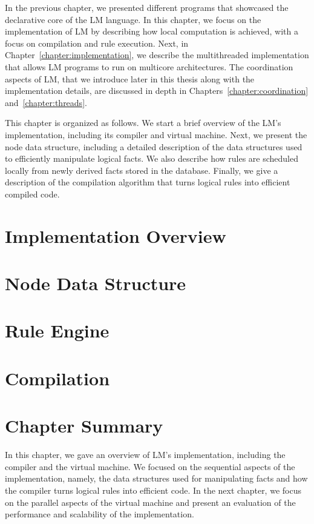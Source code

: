 
In the previous chapter, we presented different programs that showcased the
declarative core of the LM language. In this chapter, we focus on the
implementation of LM by describing how local computation is achieved, with a
focus on compilation and rule execution.  Next, in
Chapter~\ref{chapter:implementation}, we describe the multithreaded
implementation that allows LM programs to run on multicore architectures. The
coordination aspects of LM, that we introduce later in this thesis along with
the implementation details, are discussed in depth in
Chapters~\ref{chapter:coordination} and~\ref{chapter:threads}.

This chapter is organized as follows. We start a brief overview of the LM's
implementation, including its compiler and virtual machine. Next, we present the
node data structure, including a detailed description of the data structures
used to efficiently manipulate logical facts.  We also describe how rules are
scheduled locally from newly derived facts stored in the database.  Finally, we
give a description of the compilation algorithm that turns logical rules into
efficient compiled code.


\section{Implementation Overview}


\section{Node Data Structure}\label{sec:data_structures}


\section{Rule Engine}\label{section:local:rule_engine}\label{sec:implementation:rule_engine}


\section{Compilation}


\section{Chapter Summary}

In this chapter, we gave an overview of LM's implementation, including the
compiler and the virtual machine. We focused on the sequential aspects of the
implementation, namely, the data structures used for manipulating facts and how
the compiler turns logical rules into efficient code. In the next chapter, we
focus on the parallel aspects of the virtual machine and present an evaluation
of the performance and scalability of the implementation.
